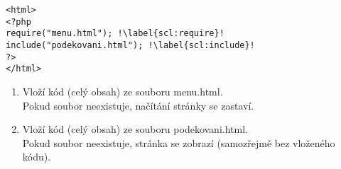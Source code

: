 \begin{minipage}[t]{.45\textwidth}
\begin{code}
\begin{verbatim}
<html>
<?php
require("menu.html"); !\label{scl:require}!
include("podekovani.html"); !\label{scl:include}!
?>
</html> 
\end{verbatim}

\label{code:php_include_require}
\end{code}
\end{minipage}
\begin{minipage}[t]{.45\textwidth}
\begin{enumerate}
\item[ř. \ref{scl:require}:] Vloží kód (celý obsah) ze souboru menu.html.\\Pokud soubor neexistuje, načítání stránky se zastaví. 
\item[ř. \ref{scl:include}:] Vloží kód (celý obsah) ze souboru podekovani.html.\\Pokud soubor neexistuje, stránka se zobrazí (samozřejmě bez vloženého kódu).
\end{enumerate}
\end{minipage}





